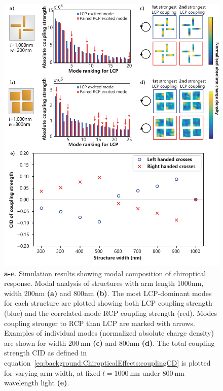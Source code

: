 \begin{figure}[htb!]	
    \centering	
    \includegraphics[scale=1]{./figures/results/EnantiomorphingChiralCrosses/l1000modes.pdf}
    \caption{\label{fig:results:EnantiomorphingChiralCrosses:l1000modes}
    \textbf{a-e}. Simulation results showing modal composition of chiroptical response. Modal analysis of structures with arm length 1000nm, width 200nm \textbf{(a)} and 800nm \textbf{(b)}. The most LCP-dominant modes for each structure are plotted showing both LCP coupling strength (blue) and the correlated-mode RCP coupling strength (red). Modes coupling stronger to RCP than LCP are marked with arrows. Examples of individual modes (normalized absolute charge density) are shown for width $\SI{200}{\nano\m}$ \textbf{(c)} and 800nm \textbf{(d)}. The total coupling strength CID as defined in equation~\ref{eq:background:ChiropticalEffects:couplingCD} is plotted for varying arm width, at fixed $l=\SI{1000}{\nano\m}$ under $\SI{800}{\nano\m}$ wavelength light \textbf{(e)}.}	
\end{figure}

